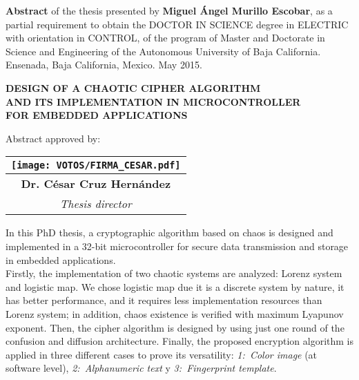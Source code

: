 
\newpage %


\textbf{Abstract} of the thesis presented by \textbf{Miguel Ángel Murillo Escobar}, as a partial requirement to obtain the DOCTOR IN SCIENCE degree in ELECTRIC with orientation in CONTROL, of the program of Master and Doctorate in Science and Engineering of the Autonomous University of Baja California. Ensenada, Baja California, Mexico. May 2015.  

\vspace{0.3cm}

\begin{center}
  \textbf{DESIGN OF A CHAOTIC CIPHER ALGORITHM \\AND ITS IMPLEMENTATION IN MICROCONTROLLER \\FOR EMBEDDED APPLICATIONS}
\end{center}  

\vspace{0.3cm}

Abstract approved by:

\vspace{0.1cm}

\begin{flushright}
	\begin{tabular}{c}
	\texttt{[image: VOTOS/FIRMA\_CESAR.pdf]} \\
	\hline
	\textbf{Dr. César Cruz Hernández} \\
	\textit{Thesis director}
	\end{tabular}
\end{flushright}

\vspace{0.3cm}

In this PhD thesis, a cryptographic algorithm based on chaos is designed and implemented in a 32-bit microcontroller for secure data transmission and storage in embedded applications. \\

Firstly, the implementation of two chaotic systems are analyzed: Lorenz system and logistic map. We chose logistic map due it is a discrete system by nature, it has better performance, and it requires less implementation resources than Lorenz system; in addition, chaos existence is verified with maximum Lyapunov exponent. Then, the cipher algorithm is designed by using just one round of the confusion and diffusion architecture.  Finally, the proposed encryption algorithm is applied in three different cases to prove its versatility: \textit{1:~Color image} (at software level), \textit{2:~Alphanumeric text} y \textit{3:~Fingerprint template}. \\ 

